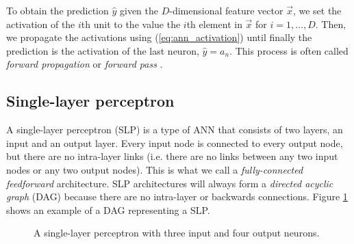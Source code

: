 To obtain the prediction $\hat{y}$ given the $D$-dimensional feature vector $\vec{x}$, we set the activation of the $i$th unit to the value the $i$th element in $\vec{x}$ for $i=1,\dots,D$.
Then, we propagate the activations using (\ref{eq:ann_activation}) until finally the prediction is the activation of the last neuron, $\hat{y}=a_n$.
This process is often called \textit{forward propagation} or \textit{forward pass} \cite{russell2010}.

\subsection{Single-layer perceptron}
A single-layer perceptron (SLP) is a type of ANN that consists of two layers, an input and an output layer.
Every input node is connected to every output node, but there are no intra-layer links (i.e. there are no links between any two input nodes or any two output nodes). 
This is what we call a \textit{fully-connected feedforward} architecture.
SLP architectures will always form a \textit{directed acyclic graph} (DAG) because there are no intra-layer or backwards connections.
Figure \ref{fig:single_layer_perceptron} shows an example of a DAG representing a SLP.

\begin{figure}
    \begin{center}
    \end{center}
    \caption{A single-layer perceptron with three input and four output neurons.}
    \label{fig:single_layer_perceptron}
\end{figure}

